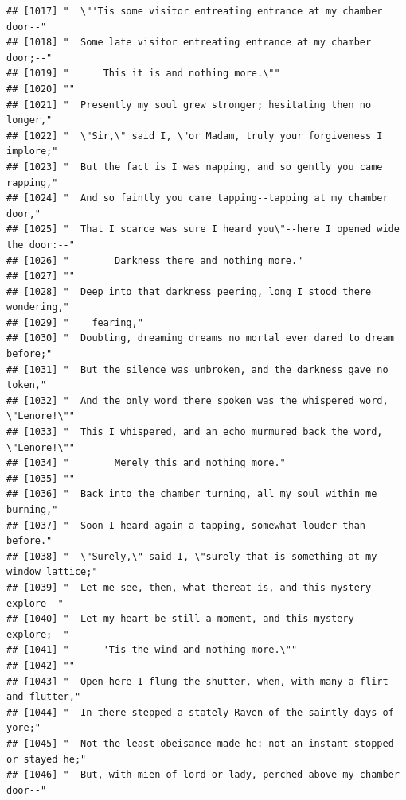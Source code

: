 \documentclass{article}\usepackage[]{graphicx}\usepackage[]{color}
\makeatletter
\newenvironment{kframe}{%
 \def\at@end@of@kframe{}%
 \ifinner\ifhmode%
  \def\at@end@of@kframe{\end{minipage}}%
  \begin{minipage}{\columnwidth}%
 \fi\fi%
 \def\FrameCommand##1{\hskip\@totalleftmargin \hskip-\fboxsep
 \colorbox{shadecolor}{##1}\hskip-\fboxsep
     \hskip-\linewidth \hskip-\@totalleftmargin \hskip\columnwidth}%
 \MakeFramed {\advance\hsize-\width
   \@totalleftmargin\z@ \linewidth\hsize
   \@setminipage}}%
 {\par\unskip\endMakeFramed%
 \at@end@of@kframe}
\newenvironment{knitrout}{}{} %
\makeatother
\begin{document}
\begin{knitrout}
\begin{kframe}
\begin{verbatim}
## [1017] "  \"'Tis some visitor entreating entrance at my chamber door--"              
## [1018] "  Some late visitor entreating entrance at my chamber door;--"               
## [1019] "      This it is and nothing more.\""                                        
## [1020] ""                                                                            
## [1021] "  Presently my soul grew stronger; hesitating then no longer,"               
## [1022] "  \"Sir,\" said I, \"or Madam, truly your forgiveness I implore;"            
## [1023] "  But the fact is I was napping, and so gently you came rapping,"            
## [1024] "  And so faintly you came tapping--tapping at my chamber door,"              
## [1025] "  That I scarce was sure I heard you\"--here I opened wide the door:--"      
## [1026] "        Darkness there and nothing more."                                    
## [1027] ""                                                                            
## [1028] "  Deep into that darkness peering, long I stood there wondering,"            
## [1029] "    fearing,"                                                                
## [1030] "  Doubting, dreaming dreams no mortal ever dared to dream before;"           
## [1031] "  But the silence was unbroken, and the darkness gave no token,"             
## [1032] "  And the only word there spoken was the whispered word, \"Lenore!\""        
## [1033] "  This I whispered, and an echo murmured back the word, \"Lenore!\""         
## [1034] "        Merely this and nothing more."                                       
## [1035] ""                                                                            
## [1036] "  Back into the chamber turning, all my soul within me burning,"             
## [1037] "  Soon I heard again a tapping, somewhat louder than before."                
## [1038] "  \"Surely,\" said I, \"surely that is something at my window lattice;"      
## [1039] "  Let me see, then, what thereat is, and this mystery explore--"             
## [1040] "  Let my heart be still a moment, and this mystery explore;--"               
## [1041] "      'Tis the wind and nothing more.\""                                     
## [1042] ""                                                                            
## [1043] "  Open here I flung the shutter, when, with many a flirt and flutter,"       
## [1044] "  In there stepped a stately Raven of the saintly days of yore;"             
## [1045] "  Not the least obeisance made he: not an instant stopped or stayed he;"     
## [1046] "  But, with mien of lord or lady, perched above my chamber door--"           

\end{verbatim}
\end{kframe}
\end{knitrout}
\end{document}
